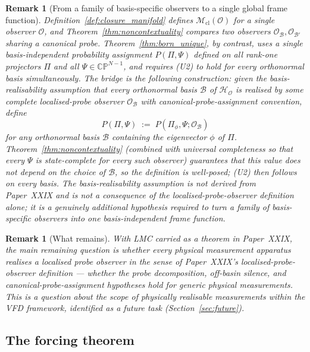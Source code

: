 \documentclass[12pt]{article}
\newtheorem{remark}[theorem]{Remark}
\newcommand{\Ocal}{\mathcal{O}}
\newcommand{\Hcal}{\mathcal{H}}
\newcommand{\Mcl}{\mathcal{M}_{\mathrm{cl}}}
\begin{document}
\begin{remark}[From a family of basis-specific observers to a single global frame function]\label{rem:basis_realisability}
Definition~\ref{def:closure_manifold} defines $\Mcl(\Ocal)$ for a single observer $\Ocal$, and Theorem~\ref{thm:noncontextuality} compares two observers $\Ocal_\mathcal{B}, \Ocal_{\mathcal{B}'}$ sharing a canonical probe. Theorem~\ref{thm:born_unique}, by contrast, uses a single basis-independent probability assignment $P(\Pi, \Psi)$ defined on all rank-one projectors $\Pi$ and all $\Psi \in \mathbb{CP}^{N-1}$, and requires (U2) to hold for every orthonormal basis simultaneously. The bridge is the following construction: given the \emph{basis-realisability} assumption that every orthonormal basis $\mathcal{B}$ of $\Hcal_\Ocal$ is realised by some complete localised-probe observer $\Ocal_\mathcal{B}$ with canonical-probe-assignment convention, define
\begin{equation}
    P(\Pi, \Psi) \;:=\; P(\Pi_\phi, \Psi; \Ocal_\mathcal{B})
\end{equation}
for any orthonormal basis $\mathcal{B}$ containing the eigenvector $\phi$ of $\Pi$. Theorem~\ref{thm:noncontextuality} (combined with universal completeness so that every $\Psi$ is state-complete for every such observer) guarantees that this value does not depend on the choice of $\mathcal{B}$, so the definition is well-posed; (U2) then follows on every basis. The basis-realisability assumption is not derived from Paper~XXIX and is not a consequence of the localised-probe-observer definition alone; it is a genuinely additional hypothesis required to turn a family of basis-specific observers into one basis-independent frame function.
\end{remark}

\begin{remark}[What remains]\label{rem:lmc_remaining}
With LMC carried as a theorem in Paper~XXIX, the main remaining question is whether every physical measurement apparatus realises a localised probe observer in the sense of Paper~XXIX's localised-probe-observer definition --- whether the probe decomposition, off-basin silence, and canonical-probe-assignment hypotheses hold for generic physical measurements. This is a question about the scope of physically realisable measurements within the VFD framework, identified as a future task (Section~\ref{sec:future}).
\end{remark}

\subsection{The forcing theorem}\label{subsec:forcing}
\end{document}
